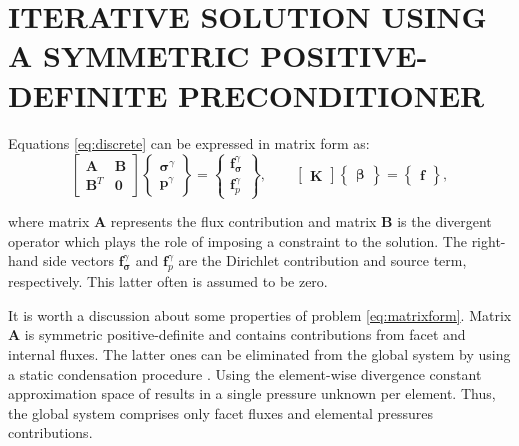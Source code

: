 \documentclass{wccm2024}
\begin{document}
\section{ITERATIVE SOLUTION USING A SYMMETRIC POSITIVE-DEFINITE PRECONDITIONER}

Equations \eqref{eq:discrete} can be expressed in matrix form as:
\vskip -0.3cm
\begin{equation} \label{eq:matrixform}
    \begin{bmatrix}
        \mathbf{A} & \mathbf{B} \\
        \mathbf{B}^T & \mathbf{0}
    \end{bmatrix}
    \begin{Bmatrix}
        \boldsymbol{\sigma}^\gamma \\
        \mathbf{p}^\gamma
    \end{Bmatrix}
    =
    \begin{Bmatrix}
        \mathbf{f}^\gamma_{\boldsymbol{\sigma}} \\
        \mathbf{f}^\gamma_{p}
    \end{Bmatrix}, \qquad
    \begin{bmatrix}
        \mathbf{K}
    \end{bmatrix}
    \begin{Bmatrix}
        \mathbf{\boldsymbol{\beta}}
    \end{Bmatrix}
    =
    \begin{Bmatrix}
        \mathbf{f}
    \end{Bmatrix},
\end{equation}

\noindent where matrix $\mathbf{A}$ represents the flux contribution and matrix $\mathbf{B}$ is the divergent operator which plays the role of imposing a constraint to the solution. The right-hand side vectors $\mathbf{f}^\gamma_{\boldsymbol{\sigma}}$ and $\mathbf{f}^\gamma_{p}$ are the Dirichlet contribution and source term, respectively. This latter often is assumed to be zero.

It is worth a discussion about some properties of problem \eqref{eq:matrixform}. Matrix $\mathbf{A}$ is symmetric positive-definite and contains contributions from facet and internal fluxes. The latter ones can be eliminated from the global system by using a static condensation procedure \cite{guyan1965reduction}. Using the element-wise divergence constant approximation space of \cite{devloo2022efficient} results in a single pressure unknown per element. Thus, the global system comprises only facet fluxes and elemental pressures contributions.
\end{document}
